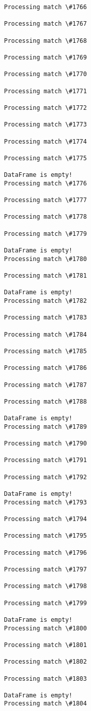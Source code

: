 \documentclass[11pt]{article}
\begin{document}
\begin{Verbatim}[commandchars=\\\{\}]
Processing match \#1766

Processing match \#1767

Processing match \#1768

Processing match \#1769

Processing match \#1770

Processing match \#1771

Processing match \#1772

Processing match \#1773

Processing match \#1774

Processing match \#1775

DataFrame is empty!
Processing match \#1776

Processing match \#1777

Processing match \#1778

Processing match \#1779

DataFrame is empty!
Processing match \#1780

Processing match \#1781

DataFrame is empty!
Processing match \#1782

Processing match \#1783

Processing match \#1784

Processing match \#1785

Processing match \#1786

Processing match \#1787

Processing match \#1788

DataFrame is empty!
Processing match \#1789

Processing match \#1790

Processing match \#1791

Processing match \#1792

DataFrame is empty!
Processing match \#1793

Processing match \#1794

Processing match \#1795

Processing match \#1796

Processing match \#1797

Processing match \#1798

Processing match \#1799

DataFrame is empty!
Processing match \#1800

Processing match \#1801

Processing match \#1802

Processing match \#1803

DataFrame is empty!
Processing match \#1804


\end{Verbatim}
\end{document}
